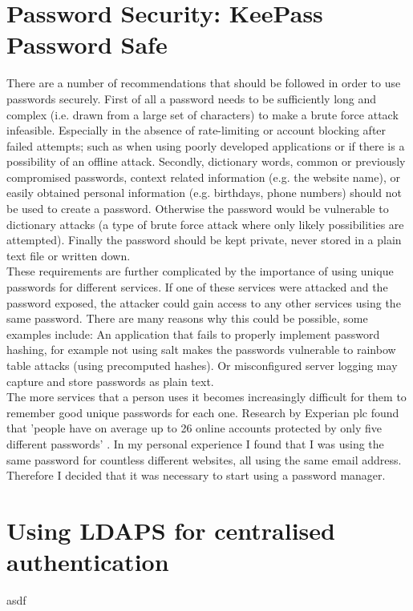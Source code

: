 \documentclass[11pt,a4paper]{scrartcl}
\begin{document}
	
\section*{Password Security: KeePass Password Safe}

There are a number of recommendations that should be followed in order to use passwords securely. 
First of all a password needs to be sufficiently long and complex (i.e. drawn from a large set of characters) to make a brute force attack infeasible. Especially in the absence of rate-limiting or account blocking after failed attempts; such as when using poorly developed applications or if there is a possibility of an offline attack. \cite{nist_password_2017}
Secondly, dictionary words, common or previously compromised passwords, context related information (e.g. the website name), or easily obtained personal information (e.g. birthdays, phone numbers) should not be used to create a password. Otherwise the password would be vulnerable to dictionary attacks (a type of brute force attack where only likely possibilities are attempted).
Finally the password should be kept private, never stored in a plain text file or written down. \cite{cern_computer_security_information}\\

These requirements are further complicated by the importance of using unique passwords for different services. If one of these services were attacked and the password exposed, the attacker could gain access to any other services using the same password. There are many reasons why this could be possible, some examples include: An application that fails to properly implement password hashing, for example not using salt makes the passwords vulnerable to rainbow table attacks (using precomputed hashes). Or misconfigured server logging may capture and store passwords as plain text.\\

The more services that a person uses it becomes increasingly difficult for them to remember good unique passwords for each one. Research by Experian plc found that 'people have on average up to 26 online accounts protected by only five different passwords' \cite{experian_2016}. In my personal experience I found that I was using the same password for countless different websites, all using the same email address. Therefore I decided that it was necessary to start using a password manager. 

\section*{Using LDAPS for centralised authentication}
	
asdf

\printbibliography
\end{document}
